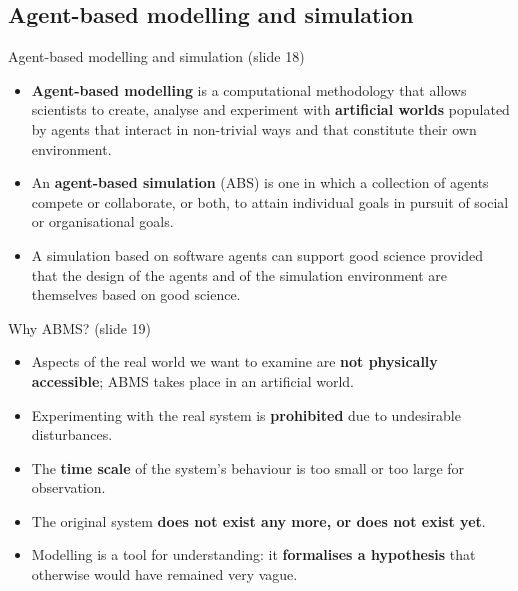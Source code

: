 \subsection{Agent-based modelling and simulation}
\label{sec:abms-netlogo}

\begin{nbdef}{Agent-based modelling and simulation (slide 18)}
\begin{itemize}[nosep]
  \item \textbf{Agent-based modelling} is a computational methodology that allows scientists
        to create, analyse and experiment with \textbf{artificial worlds} populated by agents
        that interact in non-trivial ways and that constitute their own environment.
  \item An \textbf{agent-based simulation} (ABS) is one in which a collection of agents
        compete or collaborate, or both, to attain individual goals in pursuit of social or
        organisational goals.
  \item A simulation based on software agents can support good science provided that the
        design of the agents and of the simulation environment are themselves based on good
        science.
\end{itemize}
\end{nbdef}

\begin{nbfact}{Why ABMS? (slide 19)}
\begin{itemize}[nosep]
  \item Aspects of the real world we want to examine are \textbf{not physically
        accessible}; ABMS takes place in an artificial world.
  \item Experimenting with the real system is \textbf{prohibited} due to undesirable
        disturbances.
  \item The \textbf{time scale} of the system's behaviour is too small or too large for
        observation.
  \item The original system \textbf{does not exist any more, or does not exist yet}.
  \item Modelling is a tool for understanding: it \textbf{formalises a hypothesis} that
        otherwise would have remained very vague.
\end{itemize}
\end{nbfact}

